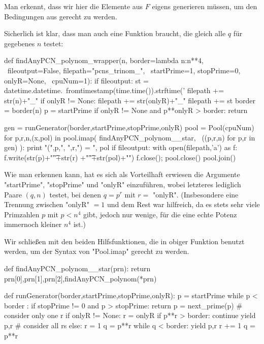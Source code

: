 Man erkennt, dass wir hier die Elemente aus $F$ eigens generieren müssen, um
den Bedingungen aus  gerecht zu werden.

Sicherlich ist klar, dass man auch eine Funktion braucht, die gleich alle
$q$ für gegebenes $n$ testet:


\begin{sagecode}[caption={Aus \url{../Sage/findAnyPCN_trinom.spyx}}]
def findAnyPCN_polynom_wrapper(n, border=lambda n:n**4, \
        fileoutput=False, filepath="pcns_trinom_", \
        startPrime=1, stopPrime=0, onlyR=None, \
        cpuNum=1):
    if fileoutput:
        st = datetime.datetime.\
                fromtimestamp(time.time()).strftime('%
        filepath += str(n)+"_"
        if onlyR != None: filepath += str(onlyR)+"_"
        filepath += st
    border = border(n)
    p = startPrime
    if onlyR != None and p**onlyR > border: return

    gen = runGenerator(border,startPrime,stopPrime,onlyR)
    pool = Pool(cpuNum)
    for p,r,n,(x,pol) in pool.imap( findAnyPCN_polynom__star, \
            ((p,r,n) for p,r in gen) ):
        print "(",p,", ",r,") = ", pol
        if fileoutput:
            with open(filepath,'a') as f:
                f.write(str(p)+"\t"+str(r)
                        +"\t"+str(pol)+"\n")
            f.close();
    pool.close()
    pool.join()
\end{sagecode}

Wie man erkennen kann, hat es sich als Vorteilhaft erwiesen die Argumente
"startPrime", "stopPrime" und "onlyR" einzuführen, wobei letzteres lediglich
Paare $(q,n)$ testet, bei denen $q = p^r$ mit $r=$ "onlyR". (Insbesondere eine
Trennung zwischen "onlyR" $=1$ und dem Rest war hilfreich, da es stets sehr
viele Primzahlen $p$ mit $p<n^4$ gibt, jedoch nur wenige, für die eine echte
Potenz immernoch kleiner $n^4$ ist.)


Wir schließen mit den beiden Hilfsfunktionen, die in obiger Funktion
benutzt werden, um der Syntax von "Pool.imap" gerecht zu werden.

\begin{sagecode}[caption={Aus \url{../Sage/findAnyPCN_trinom.spyx}}]
def findAnyPCN_polynom__star(prn):
    return prn[0],prn[1],prn[2],findAnyPCN_polynom(*prn)
\end{sagecode}


\begin{sagecode}[caption={Aus \url{../Sage/findAnyPCN_trinom.spyx}}]
def runGenerator(border,startPrime,stopPrime,onlyR):
    p = startPrime
    while p < border :
        if stopPrime != 0 and p > stopPrime: return
        p = next_prime(p)
        # consider only one r
        if onlyR != None:
            r = onlyR
            if p**r > border: continue
            yield p,r
        # consider all rs
        else:
            r = 1
            q = p**r
            while q < border:
                yield p,r
                r += 1
                q = p**r
\end{sagecode}

